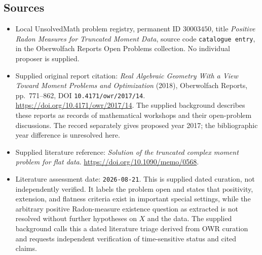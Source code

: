 \documentclass[11pt]{article}
\begin{document}
\subsection{Sources}
\begin{itemize}
\item Local UnsolvedMath problem registry, permanent ID \(30003450\), title \emph{Positive Radon Measures for Truncated Moment Data}, source code \texttt{catalogue entry}, in the Oberwolfach Reports Open Problems collection. No individual proposer is supplied.
\item Supplied original report citation: \emph{Real Algebraic Geometry With a View Toward Moment Problems and Optimization} (2018), Oberwolfach Reports, pp.\ 771--862, DOI \texttt{10.4171/owr/2017/14}. \url{https://doi.org/10.4171/owr/2017/14}. The supplied background describes these reports as records of mathematical workshops and their open-problem discussions. The record separately gives proposed year 2017; the bibliographic year difference is unresolved here.
\item Supplied literature reference: \emph{Solution of the truncated complex moment problem for flat data}. \url{https://doi.org/10.1090/memo/0568}.
\item Literature assessment date: \texttt{2026-08-21}. This is supplied dated curation, not independently verified. It labels the problem open and states that positivity, extension, and flatness criteria exist in important special settings, while the arbitrary positive Radon-measure existence question as extracted is not resolved without further hypotheses on \(X\) and the data. The supplied background calls this a dated literature triage derived from OWR curation and requests independent verification of time-sensitive status and cited claims.
\end{itemize}
\end{document}
